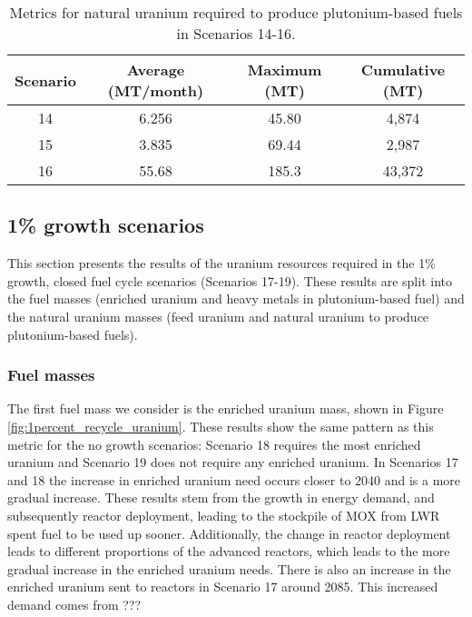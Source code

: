 \begin{table}[h!]
    \centering 
    \caption{Metrics for natural uranium required to produce 
    plutonium-based fuels in Scenarios 14-16.}
    \label{tab:s14-16_natU}
    \begin{tabular}{c c c c}
        \hline 
        Scenario & Average (MT/month) & Maximum (MT) & Cumulative (MT) \\
        \hline 
        14 & 6.256 & 45.80 & 4,874 \\
        15 & 3.835 & 69.44 & 2,987 \\
        16 & 55.68 & 185.3 & 43,372 \\
        \hline
        
    \end{tabular}
\end{table}

\subsection{1\% growth scenarios}
This section presents the results of the uranium resources required 
in the 1\% growth, closed fuel cycle scenarios (Scenarios 17-19). 
These results are split into the fuel masses (enriched uranium 
and heavy metals in plutonium-based fuel) and the natural 
uranium masses (feed uranium and natural uranium to produce 
plutonium-based fuels).

\subsubsection{Fuel masses}
The first fuel mass we consider is the enriched uranium mass, 
shown in Figure \ref{fig:1percent_recycle_uranium}. These results 
show the same pattern as this metric for the no growth scenarios:
Scenario 18 requires the most enriched uranium and Scenario 19 
does not require any enriched uranium. In Scenarios 17 and 18 the 
increase in enriched uranium need occurs closer to 2040 and is a 
more gradual increase. These results stem from the growth in energy 
demand, and subsequently reactor deployment, leading to the stockpile 
of \gls{MOX} from \gls{LWR} spent fuel to be used up sooner. 
Additionally, the change in reactor deployment leads to different 
proportions of the advanced reactors, which leads to the more gradual 
increase in the enriched uranium needs. There is also an increase in 
the enriched uranium sent to reactors in Scenario 17 
around 2085. This increased demand comes from ???


